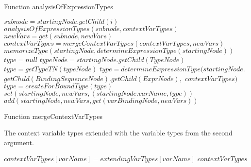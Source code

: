 \begin{algorithm}
\caption{Function analysisOfExpressionTypes}
\label{ALG_func_analysisOfExpressionTypes}
\begin{algorithmic}[1]

    \STATE $subnode = startingNode.getChild(i)$
    \STATE $analysisOfExpressionTypes(subnode, contextVarTypes)$ 
    \STATE $newVars = get(subnode, newVars)$    
    \STATE $contextVarTypes = mergeContextVarTypes(contextVarTypes, newVars)$
\ENDFOR
{}
    \STATE $memorizeType(startingNode, determineExpressionType(startingNode))$
\ENDIF
{}
    \STATE $type = null$
    \STATE $typeNode = startingNode.getChild(TypeNode)$
        \STATE $type = getTypeTN(typeNode)$
    \ELSE
        \STATE $type = determineExpressionType(startingNode.$ $getChild(BindingSequenceNode).getChild(ExprNode),$ $contextVarTypes)$
            \STATE $type = createForBoundType(type)$
        \ENDIF
    \ENDIF
    \STATE $set(startingNode, newVars, (startingNode.varName, type))$
        \STATE $add(startingNode, newVars, get(varBindingNode, newVars))$
    \ENDFOR
\ENDIF
\end{algorithmic}
\end{algorithm}



\begin{algorithm}
\caption{Function mergeContextVarTypes}
\label{ALG_function_mergeContextVarTypes}
\begin{algorithmic}[1]
\ENSURE The context variable types extended with the variable types from the second argument.

    \STATE $contextVarTypes[varName] = extendingVarTypes[varName]$
\ENDFOR
\RETURN $contextVarTypes$
\end{algorithmic}
\end{algorithm}


